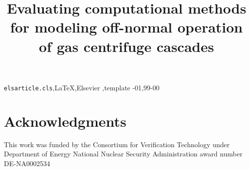 \documentclass[review]{./elsarticle}
\begin{document}
\begin{frontmatter}

    


\date{}

\title{Evaluating computational methods for modeling off-normal operation of gas centrifuge cascades}




\begin{keyword}
\texttt{elsarticle.cls}\sep \LaTeX\sep Elsevier \sep template
-01\sep  99-00
\end{keyword}

\end{frontmatter}

\linenumbers

\maketitle













\section{Acknowledgments}
This work was funded by the Consortium for Verification Technology under
Department of Energy National Nuclear Security Administration award number
DE-NA0002534



%

\begin{small}
\end{small}
\end{document}
